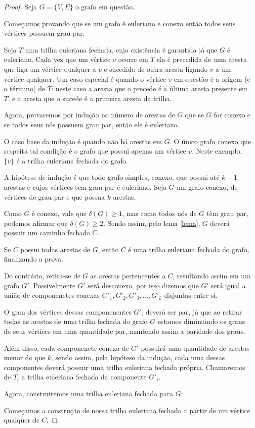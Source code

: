 \documentclass{article}
\begin{document}
\begin{proof}

Seja $G = \{V, E\}$ o grafo em questão.

Começamos provando que se um grafo é euleriano e conexo então todos seus vértices possuem grau par.

Seja $T$ uma trilha euleriana fechada, cuja existência é garantida já que $G$ é euleriano. Cada vez que um vértice $v$ ocorre em $T$ ela é precedida de uma aresta que liga um vértice qualquer a $v$ e sucedida de outra aresta ligando $v$ a um vértice qualquer. 
Um caso especial é quando o vértice $v$ em questão é a origem (e o término) de $T$: neste caso a aresta que o precede é a última aresta presente em $T$, e a aresta que o sucede é a primeira aresta da trilha.

\newline

Agora, provaremos por indução no número de arestas de $G$ que se $G$ for conexo e se todos seus nós possuem grau par, então ele é euleriano.

O caso base da indução é quando não há arestas em $G$. 
O único grafo conexo que respeita tal condição é o grafo que possui apenas um vértice $v$.
Neste exemplo, $\{v\}$ é a trilha euleriana fechada do grafo.

A hipótese de indução é que todo grafo simples, conexo, que possui até $k-1$ arestas e cujos vértices tem grau par é euleriano. 
Seja $G$ um grafo conexo, de vértices de grau par e que possua $k$ arestas.

Como $G$ é conexo, vale que $\delta(G) \geq 1$, mas como todos nós de $G$ têm grau par, podemos afirmar que $\delta(G) \geq 2$. 
Sendo assim, pelo lema \ref{lema}, $G$ deverá possuir um caminho fechado $C$.

Se $C$ possui todas arestas de $G$, então $C$ é uma trilha euleriana fechada do grafo, finalizando a prova.

Do contrário, retira-se de $G$ as arestas pertencentes a $C$, resultando assim em um grafo $G'$. 
Possivelmente $G'$ será desconexo, por isso dizemos que $G'$ será igual a união de componenetes conexas $G'_1, G'_2, G'_3, \dots, G'_k$ disjuntas entre si.

O grau dos vértices dessas componenentes $G'_i$ deverá ser par, já que ao retirar todas as arestas de uma trilha fechada do grafo $G$ estamos diminuindo os graus de seus vértices em uma quantidade par, mantendo assim a paridade dos graus.

Além disso, cada componenete conexa de $G'$ possuirá uma quantidade de arestas menor do que $k$, sendo assim, pela hipótese da indução, cada uma dessas componentes deverá possuir uma trilha euleriana fechada própria. 
Chamaremos de $T_i$ a trilha euleriana fechada da componente $G'_i$.

Agora, construiremos uma trilha euleriana fechada para $G$:

Começamos a construção de nossa trilha euleriana fechada a partir de um vértice qualquer de $C$. 


\end{proof}
\end{document}
